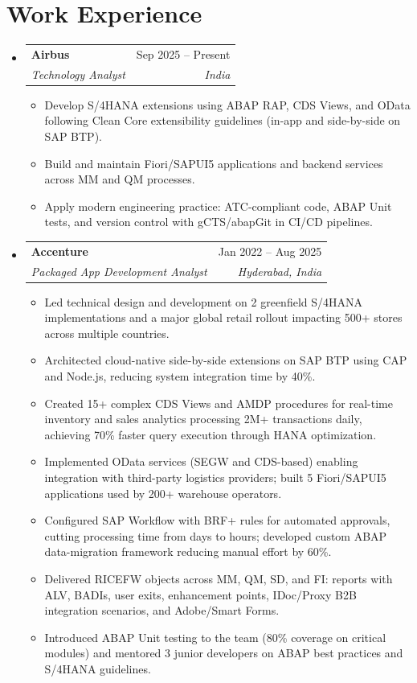 \documentclass[letterpaper,11pt]{article}
\makeatletter
\newcommand{\resumeItem}[1]{
  \item\small{
    {#1 \vspace{-2pt}}
  }
}
\newcommand{\resumeSubheading}[4]{
  \vspace{-2pt}\item
    \begin{tabular*}{0.97\textwidth}[t]{l@{\extracolsep{\fill}}r}
      \textbf{#1} & #2 \\
      \textit{\small#3} & \textit{\small #4} \\
    \end{tabular*}\vspace{-7pt}
}
\newcommand{\resumeSubHeadingListStart}{\begin{itemize}[leftmargin=0.15in, label={}]}
\newcommand{\resumeSubHeadingListEnd}{\end{itemize}}
\newcommand{\resumeItemListStart}{\begin{itemize}}
\newcommand{\resumeItemListEnd}{\end{itemize}\vspace{-5pt}}
\makeatother
\begin{document}
\section{Work Experience}
  \resumeSubHeadingListStart

    \resumeSubheading
      {Airbus}{Sep 2025 -- Present}
      {Technology Analyst}{India}
      \resumeItemListStart
        \resumeItem{Develop S/4HANA extensions using ABAP RAP, CDS Views, and OData following Clean Core extensibility guidelines (in-app and side-by-side on SAP BTP).}
        \resumeItem{Build and maintain Fiori/SAPUI5 applications and backend services across MM and QM processes.}
        \resumeItem{Apply modern engineering practice: ATC-compliant code, ABAP Unit tests, and version control with gCTS/abapGit in CI/CD pipelines.}
      \resumeItemListEnd

    \resumeSubheading
      {Accenture}{Jan 2022 -- Aug 2025}
      {Packaged App Development Analyst}{Hyderabad, India}
      \resumeItemListStart
        \resumeItem{Led technical design and development on 2 greenfield S/4HANA implementations and a major global retail rollout impacting 500+ stores across multiple countries.}
        \resumeItem{Architected cloud-native side-by-side extensions on SAP BTP using CAP and Node.js, reducing system integration time by 40\%.}
        \resumeItem{Created 15+ complex CDS Views and AMDP procedures for real-time inventory and sales analytics processing 2M+ transactions daily, achieving 70\% faster query execution through HANA optimization.}
        \resumeItem{Implemented OData services (SEGW and CDS-based) enabling integration with third-party logistics providers; built 5 Fiori/SAPUI5 applications used by 200+ warehouse operators.}
        \resumeItem{Configured SAP Workflow with BRF+ rules for automated approvals, cutting processing time from days to hours; developed custom ABAP data-migration framework reducing manual effort by 60\%.}
        \resumeItem{Delivered RICEFW objects across MM, QM, SD, and FI: reports with ALV, BADIs, user exits, enhancement points, IDoc/Proxy B2B integration scenarios, and Adobe/Smart Forms.}
        \resumeItem{Introduced ABAP Unit testing to the team (80\% coverage on critical modules) and mentored 3 junior developers on ABAP best practices and S/4HANA guidelines.}
      \resumeItemListEnd

  \resumeSubHeadingListEnd

\end{document}

